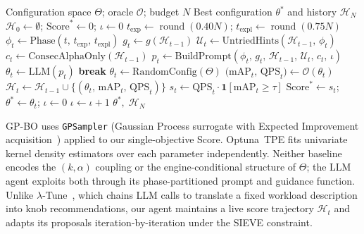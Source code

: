 \documentclass[sigconf, nonacm]{acmart}
\theoremstyle{definition}
\begin{document}
\begin{algorithm}[t]
\small
\caption{LLM-Guided ANN Optimizer}
\label{alg:agent}
\begin{algorithmic}[1]
\setlength{\itemsep}{-1.5pt}
\Require Configuration space $\Theta$; oracle $\mathcal{O}$; budget $N$
\Ensure Best configuration $\theta^*$ and history $\mathcal{H}_N$
\State $\mathcal{H}_0 \gets \emptyset$;\enspace
       $\mathrm{Score}^* \gets 0$;\enspace
       $\iota \gets 0$
\State $t_{\mathrm{exp}} \gets \operatorname{round}(0.40N)$;\enspace
       $t_{\mathrm{expl}} \gets \operatorname{round}(0.75N)$
       \hfill{}
  \State $\phi_t \gets \mathrm{Phase}(t,\,t_{\mathrm{exp}},\,t_{\mathrm{expl}})$
         \hfill{}
  \State $g_t \gets g(\mathcal{H}_{t-1})$ \hfill{}
  \State $\mathcal{U}_t \gets \mathrm{UntriedHints}(\mathcal{H}_{t-1},\,\phi_t)$
         \hfill{}
  \State $c_t \gets \mathrm{ConsecAlphaOnly}(\mathcal{H}_{t-1})$
         \hfill{}
   
    \State $p_t \gets \mathrm{BuildPrompt}(\phi_t,\,g_t,\,\mathcal{H}_{t-1},\,\mathcal{U}_t,\,c_t,\,\iota)$
    \State $\theta_t \gets \mathrm{LLM}(p_t)$
           \hfill{}
      \State \textbf{break} \hfill{}
    \EndIf
  \EndFor
         \hfill{}
    \State $\theta_t \gets \mathrm{RandomConfig}(\Theta)$
  \EndIf
  \State $\bigl(\mathrm{mAP}_t,\,\mathrm{QPS}_t\bigr) \gets \mathcal{O}(\theta_t)$
  \State $\mathcal{H}_t \gets \mathcal{H}_{t-1} \cup \{(\theta_t,\,\mathrm{mAP}_t,\,\mathrm{QPS}_t)\}$
  \State $s_t \gets \mathrm{QPS}_t \cdot \mathbf{1}[\mathrm{mAP}_t \geq \tau]$
         \hfill{}
    \State $\mathrm{Score}^* \gets s_t$;\enspace
           $\theta^* \gets \theta_t$;\enspace
           $\iota \gets 0$
  \Else
    \State $\iota \gets \iota + 1$
  \EndIf
\EndFor
\State \Return $\theta^*,\;\mathcal{H}_N$
\end{algorithmic}
\end{algorithm}

GP-BO uses \texttt{GPSampler} (Gaussian Process surrogate with Expected Improvement
acquisition~\cite{snoek2012bayesian}) applied to our single-objective Score.
Optuna~TPE fits univariate kernel density estimators over each parameter independently.
Neither baseline encodes the $(k,\alpha)$ coupling or the engine-conditional
structure of $\Theta$; the LLM agent exploits both through its phase-partitioned
prompt and guidance function.
Unlike $\lambda$-Tune~\cite{giannakouris2025lambdatune}, which chains LLM calls to translate a fixed workload description into knob recommendations, our agent maintains a live score trajectory $\mathcal{H}_t$ and adapts its proposals iteration-by-iteration under the SIEVE constraint.
\end{document}
